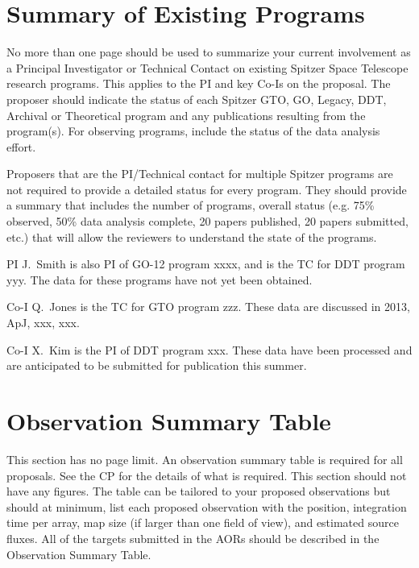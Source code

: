 \documentclass[letterpaper,12pt]{article}
\begin{document}

\section{Summary of Existing Programs}

No more than one page should be used to summarize your current
involvement as a Principal Investigator or Technical Contact on existing 
Spitzer Space Telescope research programs. This applies to the PI and 
key Co-Is on the proposal. The proposer should indicate the status of 
each Spitzer GTO, GO, Legacy, DDT, Archival or Theoretical program and 
any publications resulting from the program(s). For observing programs, 
include the status of the data analysis effort.

Proposers that are the PI/Technical contact for multiple Spitzer programs 
are not required to provide a detailed status for every program. They 
should provide a summary that includes the number of programs, overall 
status (e.g. 75\% observed, 50\% data analysis complete, 20 papers published, 
20 papers submitted, etc.) that will allow the reviewers to understand 
the state of the programs.\newline


PI J.\ Smith is also PI of GO-12 program xxxx, and is the TC for
DDT program yyy.  The data for these programs have not yet been
obtained.

Co-I Q.\ Jones is the TC for GTO program zzz.  These data are
discussed in 2013, ApJ, xxx, xxx.

Co-I X.\ Kim is the PI of DDT program xxx.  These data have been
processed and are anticipated to be submitted for publication
this summer.\newline


\section{Observation Summary Table}

This section has no page limit. An observation summary table is required for all 
proposals.  See the CP for the details of what is required. This section should not
have any figures. The table can be tailored to your proposed observations
but should at minimum, list each proposed observation with the position,
integration time per array, map size (if larger than one field of view), 
and estimated source fluxes. All of the targets submitted in the AORs 
should be described in the Observation Summary Table.\newline
\end{document}
